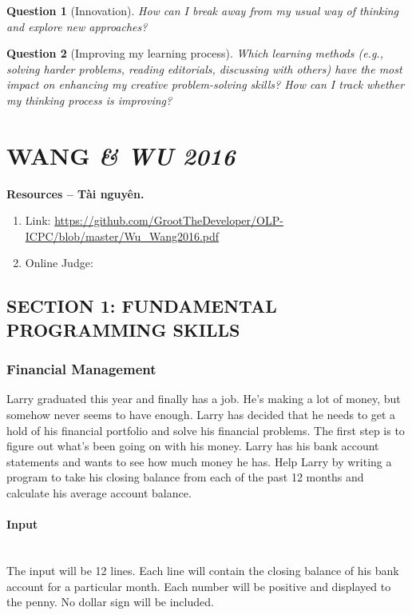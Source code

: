 \documentclass{article}
\newtheorem{question}{Question}
\begin{document}
\begin{question}[Innovation]
	 How can I break away from my usual way of thinking and explore new approaches?
\end{question}

\begin{question}[Improving my learning process]
Which learning methods (e.g., solving harder problems, reading editorials, discussing with others) have the most impact on enhancing my creative problem-solving skills? How can I track whether my thinking process is improving?
\end{question}


\section{WANG \it\& WU 2016}
\textbf{\textsf{Resources -- Tài nguyên.}}
\begin{enumerate}
\item Link: \url{https://github.com/GrootTheDeveloper/OLP-ICPC/blob/master/Wu_Wang2016.pdf}
\item Online Judge: \url{}
\end{enumerate}


\subsection{SECTION 1: FUNDAMENTAL PROGRAMMING SKILLS}
\subsubsection{Financial Management}
Larry graduated this year and finally has a job. He’s making a lot of money, but somehow never
seems to have enough. Larry has decided that he needs to get a hold of his financial portfolio and
solve his financial problems. The first step is to figure out what’s been going on with his money.
Larry has his bank account statements and wants to see how much money he has. Help Larry by
writing a program to take his closing balance from each of the past 12 months and calculate his
average account balance.

\paragraph{Input} \mbox{} \\

The input will be 12 lines. Each line will contain the closing balance of his bank account for a particular month. Each number will be positive and displayed to the penny. No dollar sign will be included.
\end{document}
